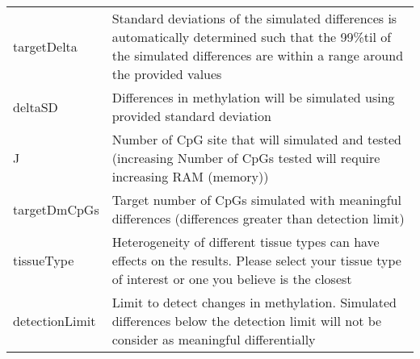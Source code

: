 \documentclass[]{article}
\begin{document}
\begin{longtable}[]{@{}ll@{}}
\begin{minipage}[t]{0.18\columnwidth}
targetDelta\strut
\end{minipage} & \begin{minipage}[t]{0.76\columnwidth}\raggedright\strut
Standard deviations of the simulated differences is automatically
determined such that the 99\%til of the simulated differences are within
a range around the provided values\strut
\end{minipage}\tabularnewline
\begin{minipage}[t]{0.18\columnwidth}\raggedright\strut
deltaSD\strut
\end{minipage} & \begin{minipage}[t]{0.76\columnwidth}\raggedright\strut
Differences in methylation will be simulated using provided standard
deviation\strut
\end{minipage}\tabularnewline
\begin{minipage}[t]{0.18\columnwidth}\raggedright\strut
J\strut
\end{minipage} & \begin{minipage}[t]{0.76\columnwidth}\raggedright\strut
Number of CpG site that will simulated and tested (increasing Number of
CpGs tested will require increasing RAM (memory))\strut
\end{minipage}\tabularnewline
\begin{minipage}[t]{0.18\columnwidth}\raggedright\strut
targetDmCpGs\strut
\end{minipage} & \begin{minipage}[t]{0.76\columnwidth}\raggedright\strut
Target number of CpGs simulated with meaningful differences (differences
greater than detection limit)\strut
\end{minipage}\tabularnewline
\begin{minipage}[t]{0.18\columnwidth}\raggedright\strut
tissueType\strut
\end{minipage} & \begin{minipage}[t]{0.76\columnwidth}\raggedright\strut
Heterogeneity of different tissue types can have effects on the results.
Please select your tissue type of interest or one you believe is the
closest\strut
\end{minipage}\tabularnewline
\begin{minipage}[t]{0.18\columnwidth}\raggedright\strut
detectionLimit\strut
\end{minipage} & \begin{minipage}[t]{0.76\columnwidth}\raggedright\strut
Limit to detect changes in methylation. Simulated differences below the
detection limit will not be consider as meaningful differentially

\end{minipage}
\end{longtable}
\end{document}
